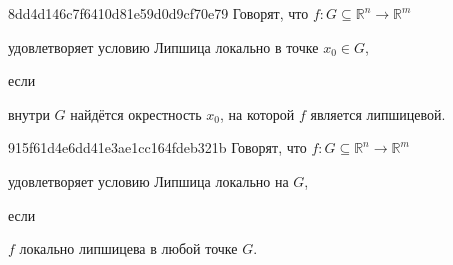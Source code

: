 \begin{note}{8dd4d146c7f6410d81e59d0d9cf70e79}
    Говорят, что \({ f : G \subseteq \mathbb R^{n} \to \mathbb R^{m} }\) \begin{icloze}{2}удовлетворяет условию Липшица локально в точке \({ x_0 \in G }\),\end{icloze} если
    \begin{icloze}{1}
        внутри \({ G }\) найдётся окрестность \({ x_0 }\), на которой \({ f }\) является липшицевой.
    \end{icloze}
\end{note}

\begin{note}{915f61d4e6dd41e3ae1cc164fdeb321b}
    Говорят, что \({ f : G \subseteq \mathbb R^{n} \to \mathbb R^{m} }\) \begin{icloze}{2}удовлетворяет условию Липшица локально на \({ G }\),\end{icloze} если
    \begin{icloze}{1}
        \({ f }\) локально липшицева в любой точке \({ G }\).
    \end{icloze}
\end{note}


